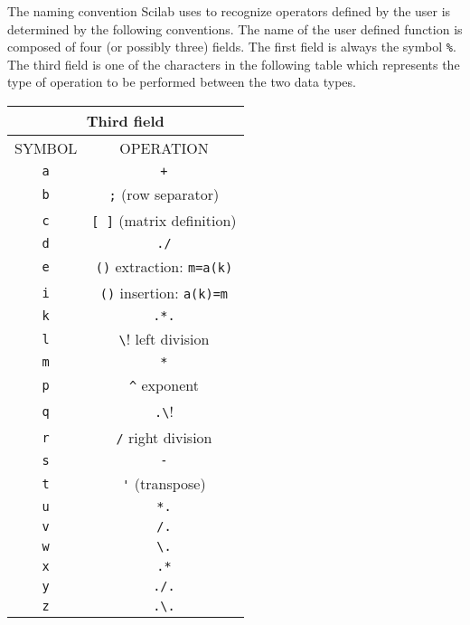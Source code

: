 	The naming convention Scilab uses to recognize operators 
defined by the user is determined by the following conventions.  The name
of the user defined function is composed of four (or possibly three)
fields.  The first field is always the symbol {\tt \%}.  
The third field is one of the characters in the following table
which represents the type of operation to be performed between the
two data types.

\begin{center}
\begin{tabular}{|c|c|}
\hline 
\multicolumn{2}{|c|}{Third field}
\\ \hline \hline
SYMBOL & OPERATION 
\\ \hline \hline
\verb!a! & \verb!+!  \\ \hline

\verb!b! & \verb!;!  (row separator)\\ \hline

\verb!c! & \verb![ ]! (matrix definition) \\ \hline

\verb!d! & \verb!./!  \\ \hline

\verb!e! & \verb!()! extraction: \verb!m=a(k)!  \\ \hline

\verb!i! & \verb!()! insertion:  \verb!a(k)=m!  \\ \hline

\verb!k! & \verb!.*.!  \\ \hline

\verb!l! & \verb!\!  left division \\ \hline

\verb!m! & \verb!*!  \\ \hline

\verb!p! & \verb!^!  exponent \\ \hline

\verb!q! & \verb!.\!  \\ \hline

\verb!r! & \verb!/!  right division \\ \hline

\verb!s! & \verb!-!  \\ \hline

\verb!t! & \verb!'!  (transpose) \\ \hline

\verb!u! & \verb!*.!  \\ \hline

\verb!v! & \verb!/.!  \\ \hline

\verb!w! & \verb!\.!  \\ \hline

\verb!x! & \verb!.*!  \\ \hline

\verb!y! & \verb!./.!  \\ \hline

\verb!z! & \verb!.\.!  \\ \hline
\end{tabular}
\end{center}

